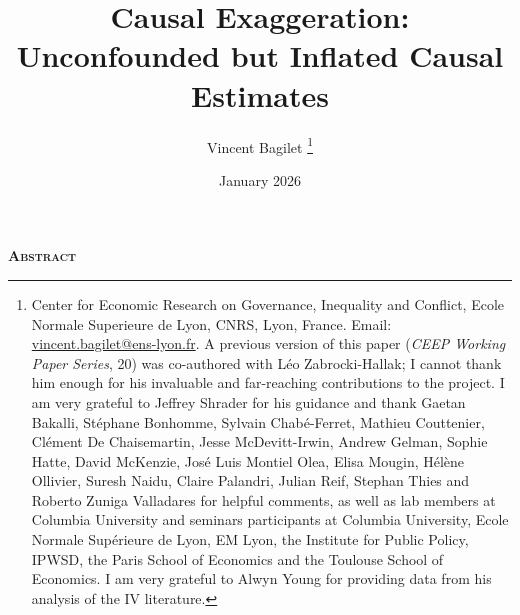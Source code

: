 \documentclass[usletter, 12pt]{article}
\begin{document}

	
	\title{Causal Exaggeration: \\ Unconfounded but Inflated Causal Estimates}

	\author{Vincent Bagilet
		\thanks{Center for Economic Research on Governance, Inequality and Conflict, Ecole Normale Superieure de Lyon, CNRS, Lyon, France. Email: \url{vincent.bagilet@ens-lyon.fr}. 
			A previous version of this paper (\textit{CEEP Working Paper Series}, 20) was co-authored with Léo Zabrocki-Hallak; I cannot thank him enough for his invaluable and far-reaching contributions to the project. I am very grateful to Jeffrey Shrader for his guidance and thank Gaetan Bakalli, Stéphane Bonhomme, Sylvain Chabé-Ferret, Mathieu Couttenier, Clément De Chaisemartin, Jesse McDevitt-Irwin, Andrew Gelman, Sophie Hatte, David McKenzie, José Luis Montiel Olea, Elisa Mougin, Hélène Ollivier, Suresh Naidu, Claire Palandri, Julian Reif, Stephan Thies and Roberto Zuniga Valladares for helpful comments, as well as lab members at Columbia University and seminars participants at Columbia University, Ecole Normale Supérieure de Lyon, EM Lyon, the Institute for Public Policy, IPWSD, the Paris School of Economics and the Toulouse School of Economics. I am very grateful to Alwyn Young for providing data from his analysis of the IV literature.}
	}
	

	\date{January 2026}
	
	\maketitle
	
	\begin{center}
		\large \textsc{\textbf{Abstract}}\\
	\end{center}
	
	
		
			
	
	
	\newpage
	
\end{document}
